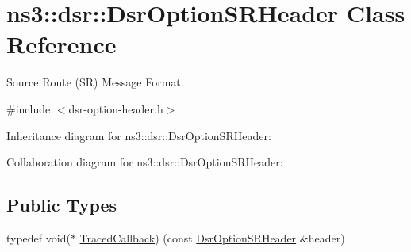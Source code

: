 \hypertarget{classns3_1_1dsr_1_1DsrOptionSRHeader}{}\section{ns3\+:\+:dsr\+:\+:Dsr\+Option\+S\+R\+Header Class Reference}
\label{classns3_1_1dsr_1_1DsrOptionSRHeader}


Source Route (SR) Message Format.  




{\ttfamily \#include $<$dsr-\/option-\/header.\+h$>$}



Inheritance diagram for ns3\+:\+:dsr\+:\+:Dsr\+Option\+S\+R\+Header\+:


Collaboration diagram for ns3\+:\+:dsr\+:\+:Dsr\+Option\+S\+R\+Header\+:
\subsection*{Public Types}
\begin{DoxyCompactItemize}
\item 
typedef void($\ast$ \hyperlink{classns3_1_1dsr_1_1DsrOptionSRHeader_a7c615275ccf9149efdcff91c5053dc90}{Traced\+Callback}) (const \hyperlink{classns3_1_1dsr_1_1DsrOptionSRHeader}{Dsr\+Option\+S\+R\+Header} \&header)
\end{DoxyCompactItemize}
